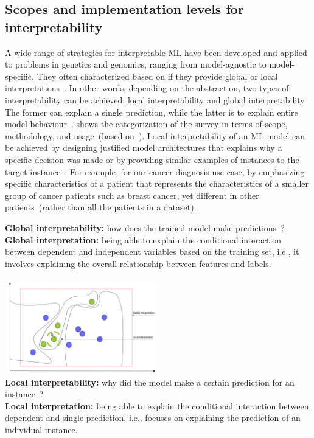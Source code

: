 \subsection{Scopes and implementation levels for interpretability}
A wide range of strategies for interpretable ML have been developed and applied to problems in genetics and genomics, ranging from model-agnostic to model-specific. They often characterized based on if they provide global or local interpretations~\cite{azodi2020opening}. In other words, depending on the abstraction, two types of interpretability can be achieved: local interpretability and global interpretability. The former can explain a single prediction, while the latter is to explain entire model behaviour~\cite{molnar2019interpretable}.  shows the categorization of the survey in terms of scope, methodology, and usage~(based on~\cite{das2020opportunities}). 
Local interpretability of an ML model can be achieved by designing justified model architectures that explains why a specific decision was made or by providing similar examples of instances to the target instance~\cite{stiglic2020interpretability}. For example, for our cancer diagnosis use case, by emphasizing specific characteristics of a patient that represents the characteristics of a smaller group of cancer patients such as breast cancer, yet different in other patients~(rather than all the patients in a dataset).

\vspace{1mm}
\begin{tcolorbox}[colback=white!3!white,colframe=gray!120!black,title=\faBook~Local vs. global interpretation]
    \scriptsize{
        \textbf{Global interpretability:} how does the trained model make predictions~\cite{molnar2019interpretable}? \\
        \textbf{Global interpretation:} being able to explain the conditional interaction between dependent and independent variables based on the training set, i.e., it involves explaining the overall relationship between features and labels.
        } \\ \\
    \includegraphics[width=0.5\textwidth,height=40mm]{images/lvg.png}\\ 
    \scriptsize{
        \textbf{Local interpretability:} why did the model make a certain prediction for an instance~\cite{molnar2019interpretable}? \\
         \textbf{Local interpretation:} being able to explain the conditional interaction between dependent and single prediction, i.e., focuses on explaining the prediction of an individual instance. 
        } 
\end{tcolorbox}

